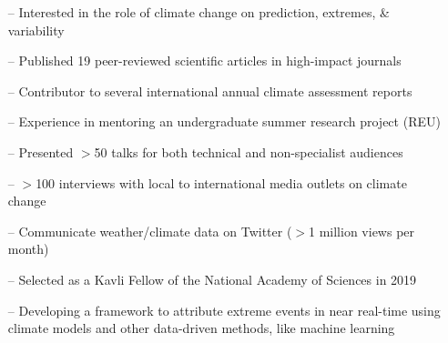 \documentclass[10pt,a4paper]{altacv}
\begin{document}

%

\begin{fullwidth}
\makecvheader
\end{fullwidth}

%

\vspace{-0.09in}
\begin{itemize}
    \setlength{\itemindent}{0.5em}
    \item[--] \small{Interested in the role of climate change on prediction, extremes, \& variability}
    \item[--] \small{Published 19 peer-reviewed scientific articles in high-impact journals}
    \item[--] \small{Contributor to several international annual climate assessment reports}
    \item[--] \small{Experience in mentoring an undergraduate summer research project (REU)}
    \item[--] \small{Presented $>$50 talks for both technical and non-specialist audiences}
    \item[--] \small{$>$100 interviews with local to international media outlets on climate change}
    \item[--] \small{Communicate weather/climate data on Twitter ($>$1 million views per month)}
    \item[--] \small{Selected as a Kavli Fellow of the National Academy of Sciences in 2019}
\end{itemize}
\medskip



\begin{itemize}
    \setlength{\itemindent}{0.5em}
    \item[--]   \small{Developing a framework to attribute extreme events in near real-time using climate models and other data-driven methods, like machine learning}
\end{itemize}
\medskip
\end{document}
